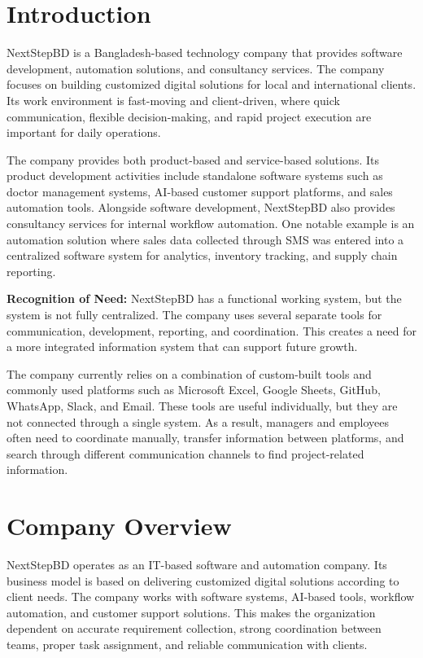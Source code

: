 \documentclass[12pt,a4paper]{report}
\begin{document}
\section{Introduction}

NextStepBD is a Bangladesh-based technology company that provides software development, automation solutions, and consultancy services. The company focuses on building customized digital solutions for local and international clients. Its work environment is fast-moving and client-driven, where quick communication, flexible decision-making, and rapid project execution are important for daily operations.

The company provides both product-based and service-based solutions. Its product development activities include standalone software systems such as doctor management systems, AI-based customer support platforms, and sales automation tools. Alongside software development, NextStepBD also provides consultancy services for internal workflow automation. One notable example is an automation solution where sales data collected through SMS was entered into a centralized software system for analytics, inventory tracking, and supply chain reporting.

\begin{highlightBox}
\textbf{Recognition of Need:} NextStepBD has a functional working system, but the system is not fully centralized. The company uses several separate tools for communication, development, reporting, and coordination. This creates a need for a more integrated information system that can support future growth.
\end{highlightBox}

The company currently relies on a combination of custom-built tools and commonly used platforms such as Microsoft Excel, Google Sheets, GitHub, WhatsApp, Slack, and Email. These tools are useful individually, but they are not connected through a single system. As a result, managers and employees often need to coordinate manually, transfer information between platforms, and search through different communication channels to find project-related information.

\section{Company Overview}

NextStepBD operates as an IT-based software and automation company. Its business model is based on delivering customized digital solutions according to client needs. The company works with software systems, AI-based tools, workflow automation, and customer support solutions. This makes the organization dependent on accurate requirement collection, strong coordination between teams, proper task assignment, and reliable communication with clients.
\end{document}
